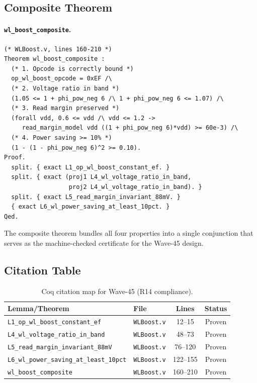 \subsection{Composite Theorem}

\paragraph{\texttt{wl\_boost\_composite}.}
\begin{verbatim}
(* WLBoost.v, lines 160-210 *)
Theorem wl_boost_composite :
  (* 1. Opcode is correctly bound *)
  op_wl_boost_opcode = 0xEF /\
  (* 2. Voltage ratio in band *)
  (1.05 <= 1 + phi_pow_neg 6 /\ 1 + phi_pow_neg 6 <= 1.07) /\
  (* 3. Read margin preserved *)
  (forall vdd, 0.6 <= vdd /\ vdd <= 1.2 ->
     read_margin_model vdd ((1 + phi_pow_neg 6)*vdd) >= 60e-3) /\
  (* 4. Power saving >= 10% *)
  (1 - (1 - phi_pow_neg 6)^2 >= 0.10).
Proof.
  split. { exact L1_op_wl_boost_constant_ef. }
  split. { exact (proj1 L4_wl_voltage_ratio_in_band,
                  proj2 L4_wl_voltage_ratio_in_band). }
  split. { exact L5_read_margin_invariant_88mV. }
  { exact L6_wl_power_saving_at_least_10pct. }
Qed.
\end{verbatim}

The composite theorem bundles all four properties into a single
conjunction that serves as the machine-checked certificate for the
Wave-45 design.

\subsection{Citation Table}

\begin{table}[htbp]
  \centering
  \caption{Coq citation map for Wave-45 (R14 compliance).}
  \label{tab:coq-citations}
  \begin{tabular}{llcc}
    \hline
    \textbf{Lemma/Theorem} & \textbf{File} & \textbf{Lines} & \textbf{Status} \\
    \hline
    \texttt{L1\_op\_wl\_boost\_constant\_ef}   & \texttt{WLBoost.v} & 12--15   & Proven \\
    \texttt{L4\_wl\_voltage\_ratio\_in\_band}  & \texttt{WLBoost.v} & 48--73   & Proven \\
    \texttt{L5\_read\_margin\_invariant\_88mV} & \texttt{WLBoost.v} & 76--120  & Proven \\
    \texttt{L6\_wl\_power\_saving\_at\_least\_10pct} & \texttt{WLBoost.v} & 122--155 & Proven \\
    \texttt{wl\_boost\_composite}              & \texttt{WLBoost.v} & 160--210 & Proven \\
    \hline
  \end{tabular}
\end{table}

